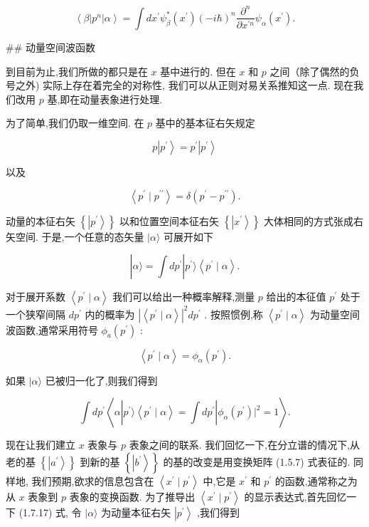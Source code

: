 \documentclass[lang=cn,newtx,10pt,scheme=chinese,thmcnt=section]{elegantbook}
\begin{document}
$$
\left\langle {\beta \left| {p}^{n}\right| \alpha }\right\rangle = \int d{x}^{\prime }{\psi }_{\beta }^{ * }\left( {x}^{\prime }\right) {\left( -i\hbar \right) }^{n}\frac{{\partial }^{n}}{\partial {x}^{\prime n}}{\psi }_{\alpha }\left( {x}^{\prime }\right) . \tag{1.7.21}
$$

## 动量空间波函数

到目前为止,我们所做的都只是在 $x$ 基中进行的. 但在 $x$ 和 $p$ 之间（除了偶然的负号之外) 实际上存在着完全的对称性, 我们可以从正则对易关系推知这一点. 现在我们改用 $p$ 基,即在动量表象进行处理.

为了简单,我们仍取一维空间. 在 $p$ 基中的基本征右矢规定

$$
p\left| {p}^{\prime }\right\rangle = {p}^{\prime }\left| {p}^{\prime }\right\rangle \tag{1.7.22}
$$

以及

$$
\left\langle {{p}^{\prime } \mid {p}^{\prime \prime }}\right\rangle = \delta \left( {{p}^{\prime } - {p}^{\prime \prime }}\right) . \tag{1. 7.23}
$$

动量的本征右矢 $\left\{ \left| {p}^{\prime }\right\rangle \right\}$ 以和位置空间本征右矢 $\left\{ \left| {x}^{\prime }\right\rangle \right\}$ 大体相同的方式张成右矢空间. 于是,一个任意的态矢量 $|\alpha \rangle$ 可展开如下

$$
\left| {\alpha \rangle = \int d{p}^{\prime }}\right| {p}^{\prime }\rangle \left\langle {{p}^{\prime } \mid \alpha }\right\rangle . \tag{1. 7.24}
$$

对于展开系数 $\left\langle {{p}^{\prime } \mid \alpha }\right\rangle$ 我们可以给出一种概率解释,测量 $p$ 给出的本征值 ${p}^{\prime }$ 处于一个狭窄间隔 $d{p}^{\prime }$ 内的概率为 ${\left| \left\langle {p}^{\prime } \mid \alpha \right\rangle \right| }^{2}d{p}^{\prime }$ . 按照惯例,称 $\left\langle {{p}^{\prime } \mid \alpha }\right\rangle$ 为动量空间波函数,通常采用符号 ${\phi }_{a}\left( {p}^{\prime }\right)$ :

$$
\left\langle {{p}^{\prime } \mid \alpha }\right\rangle = {\phi }_{\alpha }\left( {p}^{\prime }\right) . \tag{1.7.25}
$$

如果 $|\alpha \rangle$ 已被归一化了,则我们得到

$$
\int d{p}^{\prime }\left\langle {\alpha \left| {{p}^{\prime }\rangle \left\langle {{p}^{\prime } \mid \alpha }\right\rangle = \int d{p}^{\prime }}\right| {\phi }_{\alpha }\left( {p}^{\prime }\right) {\left. \right| }^{2} = 1}\right\rangle . \tag{1.7.26}
$$

现在让我们建立 $x$ 表象与 $p$ 表象之间的联系. 我们回忆一下,在分立谱的情况下,从老的基 $\left\{ \left| {a}^{\prime }\right\rangle \right\}$ 到新的基 $\left\{ \left| {b}^{\prime }\right\rangle \right\}$ 的基的改变是用变换矩阵 (1.5.7) 式表征的. 同样地, 我们预期,欲求的信息包含在 $\left\langle {{x}^{\prime } \mid {p}^{\prime }}\right\rangle$ 中,它是 ${x}^{\prime }$ 和 ${p}^{\prime }$ 的函数,通常称之为从 $x$ 表象到 $p$ 表象的变换函数. 为了推导出 $\left\langle {{x}^{\prime } \mid {p}^{\prime }}\right\rangle$ 的显示表达式,首先回忆一下 (1.7.17) 式, 令 $|\alpha \rangle$ 为动量本征右矢 $\left| {p}^{\prime }\right\rangle$ ,我们得到
\end{document}
